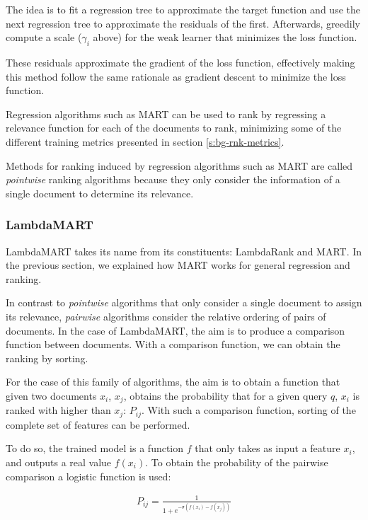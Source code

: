 The idea is to fit a regression tree to approximate the target function and use the next regression tree to
approximate the residuals of the first. Afterwards, greedily compute a scale ($\gamma_i$ above) for the weak learner that minimizes
the loss function.

These residuals approximate the gradient of the loss function, effectively making this method follow the same
rationale as gradient descent to minimize the loss function.

Regression algorithms such as MART can be used to rank
by regressing a relevance function for each of the documents to rank, minimizing some of the 
different training metrics presented in section \ref{s:bg-rnk-metrics}.

Methods for ranking induced by regression algorithms such as MART are called \emph{pointwise} ranking algorithms
because they only consider the information of a single document to determine its relevance.

\subsubsection{LambdaMART}
LambdaMART\cite{lambdamart} takes its name from its constituents: LambdaRank and MART. In the previous section, we 
explained how MART works for general regression and ranking.

In contrast to \emph{pointwise} algorithms that only consider a single document to assign its relevance,
\emph{pairwise} algorithms consider the relative ordering of pairs of documents. In the case of LambdaMART, 
the aim is to produce a comparison function between documents. With a comparison function, we can obtain the
ranking by sorting.

For the case of this family of algorithms, the aim is to obtain a function that given two documents $x_i$, $x_j$, 
obtains the probability that for a given query $q$, $x_i$ is ranked with higher than $x_j$: $P_{ij}$. With 
such a comparison function, sorting of the complete set of features can be performed.

To do so, the trained model is a function $f$ that only takes as input a feature $x_i$, 
and outputs a real value $f(x_i)$. To obtain the probability of the pairwise comparison a logistic function is used:

\begin{align*}
P_{ij} = \frac{1}{1+e^{-\sigma(f(x_i)-f(x_j))}}
\end{align*}

